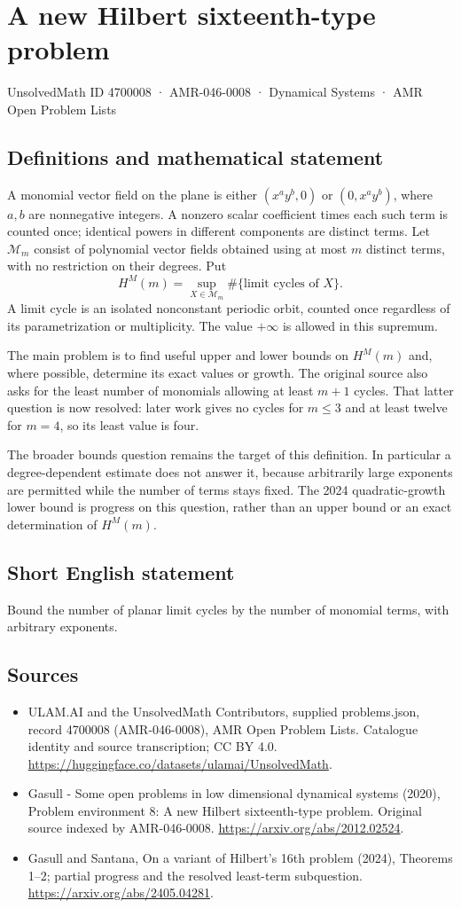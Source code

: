 \documentclass[11pt,a4paper]{article}
\begin{document}
\section*{A new Hilbert sixteenth-type problem}\label{4700008}
{\small UnsolvedMath ID 4700008 · AMR-046-0008 · Dynamical Systems · AMR Open Problem Lists}
\subsection{Definitions and mathematical statement}
A monomial vector field on the plane is either $(x^ay^b,0)$ or
$(0,x^ay^b)$, where $a,b$ are nonnegative integers. A nonzero scalar
coefficient times each such term is counted once; identical powers in
different components are distinct terms. Let $\mathcal M_m$ consist of
polynomial vector fields obtained using at most $m$ distinct terms, with no
restriction on their degrees. Put
\[
 H^M(m)=\sup_{X\in\mathcal M_m}\#\{\text{limit cycles of }X\}.
\]
A limit cycle is an isolated nonconstant periodic orbit, counted once
regardless of its parametrization or multiplicity. The value $+\infty$ is
allowed in this supremum.

The main problem is to find useful upper and lower bounds on $H^M(m)$ and,
where possible, determine its exact values or growth. The original source
also asks for the least number of monomials allowing at least $m+1$ cycles.
That latter question is now resolved: later work gives no cycles for
$m\le3$ and at least twelve for $m=4$, so its least value is four.

The broader bounds question remains the target of this definition. In
particular a degree-dependent estimate does not answer it, because arbitrarily
large exponents are permitted while the number of terms stays fixed. The
2024 quadratic-growth lower bound is progress on this question, rather than
an upper bound or an exact determination of $H^M(m)$.
\subsection{Short English statement}
Bound the number of planar limit cycles by the number of monomial terms, with arbitrary exponents.
\subsection{Sources}
\begin{itemize}
\item[S1] ULAM.AI and the UnsolvedMath Contributors, supplied problems.json, record 4700008 (AMR-046-0008), AMR Open Problem Lists. Catalogue identity and source transcription; CC BY 4.0.
\url{https://huggingface.co/datasets/ulamai/UnsolvedMath}.
\item[S2] Gasull - Some open problems in low dimensional dynamical systems (2020), Problem environment 8: A new Hilbert sixteenth-type problem. Original source indexed by AMR-046-0008.
\url{https://arxiv.org/abs/2012.02524}.
\item[S3] Gasull and Santana, On a variant of Hilbert’s 16th problem (2024), Theorems 1–2; partial progress and the resolved least-term subquestion.
\url{https://arxiv.org/abs/2405.04281}.
\end{itemize}
\end{document}
